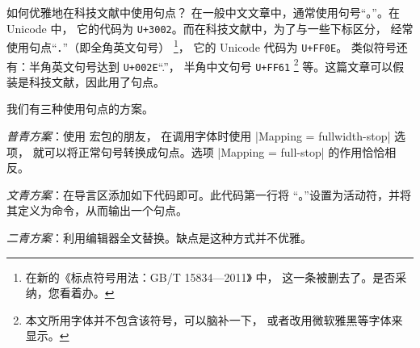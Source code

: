 \begin{myQA}{如何优雅地在科技文献中使用句点？}
	在一般中文文章中，通常使用句号“{。}”。在 Unicode 中，
	它的代码为 \texttt{U+3002}。而在科技文献中，为了与一些下标区分，
	经常使用句点“．”（即全角英文句号）
	\footnote{在新的《标点符号用法：GB/T 15834—2011》
		\textsuperscript{\cite{GB/T15834-2011标点符号}} 中，
		这一条被删去了。是否采纳，您看着办。}，
	它的 Unicode 代码为 \texttt{U+FF0E}。
	类似符号还有：半角英文句号达到 \texttt{U+002E}“.”，
	半角中文句号 \texttt{U+FF61}
	\footnote{本文所用字体并不包含该符号，可以脑补一下，
		或者改用微软雅黑等字体来显示。}
	等。这篇文章可以假装是科技文献，因此用了句点。
	
	我们有三种使用句点的方案。
	
	\emph{普青方案}：使用   宏包的朋友，
	在调用字体时使用
	\code|Mapping = fullwidth-stop|  选项，
	就可以将正常句号转换成句点。选项 \code|Mapping = full-stop|
	的作用恰恰相反。
	
	\emph{文青方案}：在导言区添加如下代码即可。此代码第一行将
	“{。}”设置为活动符，并将其定义为命令，从而输出一个句点。
	 
	
	\emph{二青方案}：利用编辑器全文替换。缺点是这种方式并不优雅。
	
\end{myQA}

